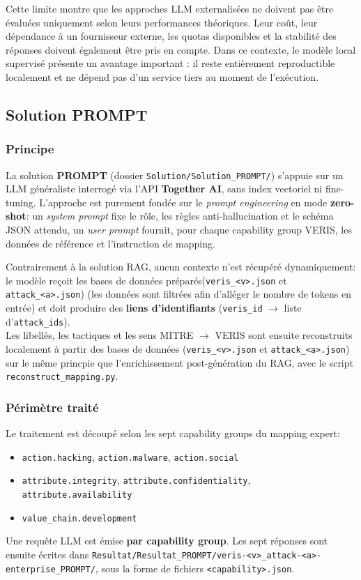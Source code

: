 \documentclass[a4paper,12pt]{article}
\begin{document}
Cette limite montre que les approches LLM externalisées ne doivent pas être évaluées uniquement selon leurs performances théoriques. Leur coût, leur dépendance à un fournisseur externe, les quotas disponibles et la stabilité des réponses doivent également être pris en compte. Dans ce contexte, le modèle local supervisé présente un avantage important : il reste entièrement reproductible localement et ne dépend pas d'un service tiers au moment de l'exécution.

\subsection{Solution PROMPT}

\subsubsection{Principe}

La solution \textbf{PROMPT} (dossier \texttt{Solution/Solution\_PROMPT/}) s'appuie sur un LLM généraliste interrogé via l'API \textbf{Together AI}, sans index vectoriel ni fine-tuning. L'approche est purement fondée sur le \emph{prompt engineering} en mode \textbf{zero-shot}: un \emph{system prompt} fixe le rôle, les règles anti-hallucination et le schéma JSON attendu, un \emph{user prompt} fournit, pour chaque capability group VERIS, les données de référence et l'instruction de mapping.

Contrairement à la solution RAG, aucun contexte n'est récupéré dynamiquement: le modèle reçoit les bases de données préparés(\texttt{veris\_<v>.json} et \texttt{attack\_<a>.json}) (les données sont filtrées afin d'alléger le nombre de tokens en entrée) et doit produire des \textbf{liens d'identifiants} (\texttt{veris\_id} $\rightarrow$ liste d'\texttt{attack\_ids}).\\
Les libellés, les tactiques et les sens MITRE $\rightarrow$ VERIS sont ensuite reconstruits localement à partir des bases de données (\texttt{veris\_<v>.json} et \texttt{attack\_<a>.json}) sur le même princpie que l'enrichissement post-génération du RAG, avec le script \texttt{reconstruct\_mapping.py}.

\subsubsection{Périmètre traité}
Le traitement est découpé selon les sept capability groups du mapping expert:
\begin{itemize}
    \item \texttt{action.hacking}, \texttt{action.malware}, \texttt{action.social}
    \item \texttt{attribute.integrity}, \texttt{attribute.confidentiality},
          \texttt{attribute.availability}
    \item \texttt{value\_chain.development}
\end{itemize}
Une requête LLM est émise \textbf{par capability group}. Les sept réponses sont ensuite écrites dans \texttt{Resultat/Resultat\_PROMPT/veris-<v>\_attack-<a>-enterprise\_PROMPT/}, sous la forme de fichiers \texttt{<capability>.json}.
\end{document}
